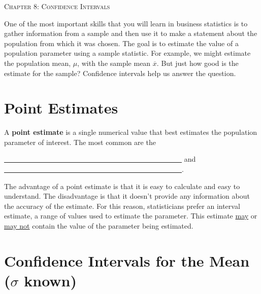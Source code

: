 \documentclass[12pt, letterpaper]{article}
\theoremstyle{definition}
\begin{document}


\begin{center}

{\LARGE \textsc{Chapter 8:  Confidence Intervals}}
\end{center}


\noindent  One of the most important skills that you will learn in business statistics is to gather information from a sample and then use it to make a statement about the population from which it was chosen.  The goal is to estimate the value of a population parameter using a sample statistic.  For example, we might estimate the population mean, $\mu$, with the sample mean $\overline{x}$.  But just how good is the estimate for the sample?  Confidence intervals help us answer the question.


\section*{Point Estimates}

\begin{defn}
A \textbf{point estimate} is a single numerical value that best estimates the population parameter of interest.  The most common are the

\vspace*{.1in}
\underline{~~~~~~~~~~~~~~~~~~~~~~~~~~~~~~~~~~~~~~~~~~~~~~~~~~}
and \underline{~~~~~~~~~~~~~~~~~~~~~~~~~~~~~~~~~~~~~~~~~~~~~~~~~~}.

\end{defn}


\begin{statement}
The advantage of a point estimate is that it is easy to calculate and easy to understand.  The disadvantage is that it doesn't provide any information about the accuracy of the estimate.  For this reason, statisticians prefer an interval estimate, a range of values used to estimate the parameter.  This estimate \underline{may} or \underline{may not} contain the value of the parameter being estimated.
\end{statement}


\section*{Confidence Intervals for the Mean ($\sigma$ known)}
\end{document}
